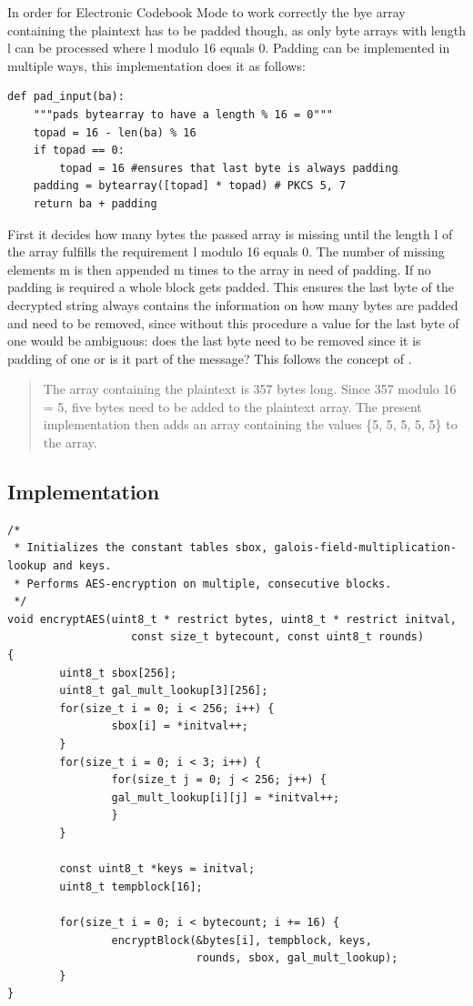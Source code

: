 In order for Electronic Codebook Mode to work correctly the bye array
containing the plaintext has to be padded though, as only byte arrays
with length l can be processed where l modulo 16 equals 0. Padding can
be implemented in multiple ways, this implementation does it as follows:

\begin{lstlisting}
def pad_input(ba):
    """pads bytearray to have a length % 16 = 0"""
    topad = 16 - len(ba) % 16
    if topad == 0:
        topad = 16 #ensures that last byte is always padding
    padding = bytearray([topad] * topad) # PKCS 5, 7
    return ba + padding
\end{lstlisting}

First it decides how many bytes the passed array is missing until the
length l of the array fulfills the requirement l modulo 16 equals 0. The
number of missing elements m is then appended m times to the array in
need of padding. If no padding is required a whole block gets padded.
This ensures the last byte of the decrypted string always contains the
information on how many bytes are padded and need to be removed, since
without this procedure a value for the last byte of one would be
ambiguous: does the last byte need to be removed since it is padding of
one or is it part of the message? This follows the concept of \cite[ch. 10.3 Note 2]{RFC2315}.

\begin{quote}
The array containing the plaintext is 357 bytes long. Since 357 modulo 16 = 5,
five bytes need to be added to the plaintext array. The present
implementation then adds an array containing the values \{5, 5, 5, 5,
5\} to the array.
\end{quote}

\hypertarget{implementation-6}{%
\subsection{Implementation}\label{implementation-6}}

\begin{lstlisting}
/*
 * Initializes the constant tables sbox, galois-field-multiplication-lookup and keys.
 * Performs AES-encryption on multiple, consecutive blocks.
 */
void encryptAES(uint8_t * restrict bytes, uint8_t * restrict initval,
                   const size_t bytecount, const uint8_t rounds)
{
        uint8_t sbox[256];
        uint8_t gal_mult_lookup[3][256];
        for(size_t i = 0; i < 256; i++) {
                sbox[i] = *initval++;
        }
        for(size_t i = 0; i < 3; i++) {
                for(size_t j = 0; j < 256; j++) {
                gal_mult_lookup[i][j] = *initval++;
                }
        }

        const uint8_t *keys = initval;
        uint8_t tempblock[16];

        for(size_t i = 0; i < bytecount; i += 16) {
                encryptBlock(&bytes[i], tempblock, keys,
                             rounds, sbox, gal_mult_lookup);
        }
}
\end{lstlisting}

